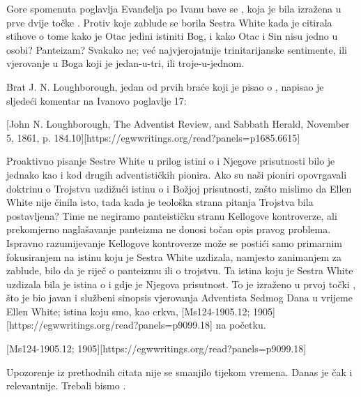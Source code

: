 Gore spomenuta poglavlja Evanđelja po Ivanu bave se , koja je bila izražena u prve dvije točke . Protiv koje zablude se borila Sestra White kada je citirala stihove o tome kako je Otac jedini istiniti Bog, i kako Otac i Sin nisu jedno u osobi? Panteizam? Svakako ne; već najvjerojatnije trinitarijanske sentimente, ili vjerovanje u Boga koji je jedan-u-tri, ili troje-u-jednom.

Brat J. N. Loughborough, jedan od prvih braće koji je pisao o , napisao je sljedeći komentar na Ivanovo poglavlje 17:

[John N. Loughborough, The Adventist Review, and Sabbath Herald, November 5, 1861, p. 184.10][https://egwwritings.org/read?panels=p1685.6615]

Proaktivno pisanje Sestre White u prilog istini o  i Njegove prisutnosti bilo je jednako kao i kod drugih adventističkih pionira. Ako su naši pioniri opovrgavali doktrinu o Trojstvu uzdižući istinu o  i Božjoj prisutnosti, zašto mislimo da Ellen White nije činila isto, tada kada je teološka strana pitanja Trojstva bila postavljena? Time ne negiramo panteističku stranu Kellogove kontroverze, ali prekomjerno naglašavanje panteizma ne donosi točan opis pravog problema. Ispravno razumijevanje Kellogove kontroverze može se postići samo primarnim fokusiranjem na istinu koju je Sestra White uzdizala, namjesto zanimanjem za zablude, bilo da je riječ o panteizmu ili o trojstvu. Ta istina koju je Sestra White uzdizala bila je istina o  i gdje je Njegova prisutnost. To je izraženo u prvoj točki , što je bio javan i službeni sinopsis vjerovanja Adventista Sedmog Dana u vrijeme Ellen White; istina koju smo, kao crkva, [Ms124-1905.12; 1905][https://egwwritings.org/read?panels=p9099.18] na početku.

[Ms124-1905.12; 1905][https://egwwritings.org/read?panels=p9099.18]

Upozorenje iz prethodnih citata nije se smanjilo tijekom vremena. Danas je čak i relevantnije. Trebali bismo .
